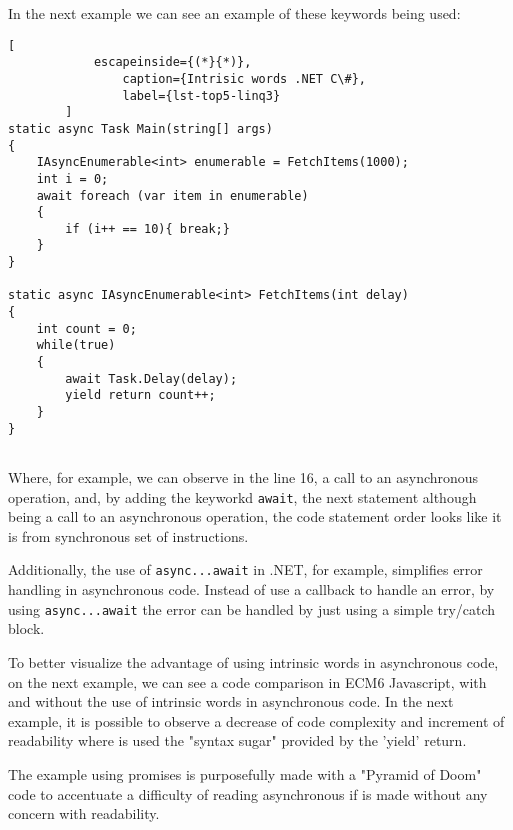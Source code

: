 	In the next example we can see an example of these keywords being used:

	\begin{center}
		\lstset{basicstyle=\scriptsize\ttfamily,frame=bottomline}
		\begin{minipage}[t][][b]{.46\textwidth}
		\begin{lstlisting}[
			escapeinside={(*}{*)},
				caption={Intrisic words .NET C\#},
				label={lst-top5-linq3}
		]
static async Task Main(string[] args)
{
	IAsyncEnumerable<int> enumerable = FetchItems(1000);
	int i = 0;
	await foreach (var item in enumerable)
	{
		if (i++ == 10){ break;}
	}
}

static async IAsyncEnumerable<int> FetchItems(int delay)
{
	int count = 0;
	while(true)
	{
		await Task.Delay(delay);
		yield return count++;
	}
}
		
		\end{lstlisting}
		\end{minipage}
	\end{center}


	Where, for example, we can observe in the line 16, a call to an asynchronous operation, and, by adding the keyworkd \texttt{await}, the next statement although being a call to an asynchronous operation, the code statement order looks like it is from synchronous set of instructions. 
	
	Additionally, the use of \texttt{async...await} in .NET, for example, simplifies error handling in asynchronous code. Instead of use a callback to handle an error, by using \texttt{async...await} the error can be handled by just using a simple try/catch block. 

	
	To better visualize the advantage of using intrinsic words in asynchronous code, on the next example, we can see a code comparison in ECM6 Javascript, with and without the use of intrinsic words in asynchronous code. 
	In the next example, it is possible to observe a decrease of code complexity and increment of readability where is used the "syntax sugar" provided by the 'yield' return. 
	
	The example using promises is purposefully made with a "Pyramid of Doom" code to accentuate a difficulty of reading asynchronous if is made without any concern with readability.
	
